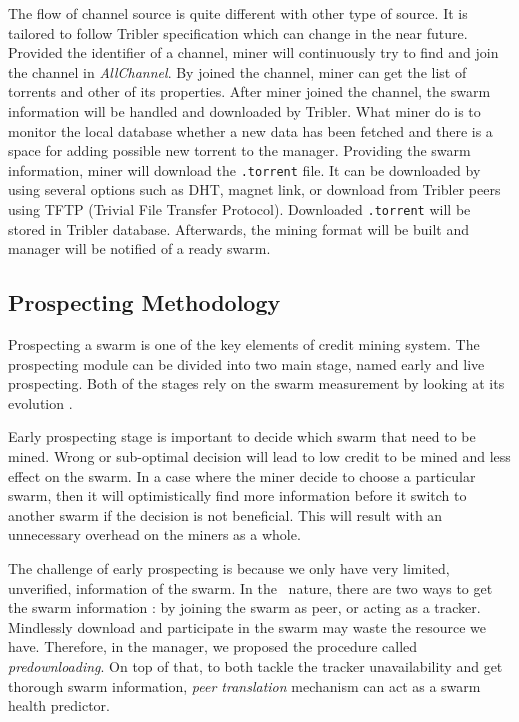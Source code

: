 The flow of channel source is quite different with other type of source. It is tailored to follow Tribler specification which can change in the near future. Provided the identifier of a channel, miner will continuously try to find and join the channel in \textit{AllChannel}. By joined the channel, miner can get the list of torrents and other of its properties. After miner joined the channel, the swarm information will be handled and downloaded by Tribler. What miner do is to monitor the local database whether a new data has been fetched and there is a space for adding possible new torrent to the manager. Providing the swarm information, miner will download the \texttt{.torrent} file. It can be downloaded by using several options such as DHT, magnet link, or download from Tribler peers using TFTP (Trivial File Transfer Protocol). Downloaded \texttt{.torrent} will be stored in Tribler database. Afterwards, the mining format will be built and manager will be notified of a ready swarm.  

\subsection{Prospecting Methodology}
\label{section:prospection}
Prospecting a swarm is one of the key elements of credit mining system. The prospecting module can be divided into two main stage, named early and live prospecting. Both of the stages rely on the swarm measurement by looking at its evolution \cite{2013:swarmevolution:su}. 

Early prospecting stage is important to decide which swarm that need to be mined. Wrong or sub-optimal decision will lead to low credit to be mined and less effect on the swarm. In a case where the miner decide to choose a particular swarm, then it will optimistically find more information before it switch to another swarm if the decision is not beneficial. This will result with an unnecessary overhead on the miners as a whole.  

The challenge of early prospecting is because we only have very limited, unverified, information of the swarm. In the \bt~nature, there are two ways to get the swarm information : by joining the swarm as peer, or acting as a tracker. Mindlessly download and participate in the swarm may waste the resource we have. Therefore, in the manager, we proposed the procedure called \textit{predownloading}. On top of that, to both tackle the tracker unavailability and get thorough swarm information, \textit{peer translation} mechanism can act as a swarm health predictor.

